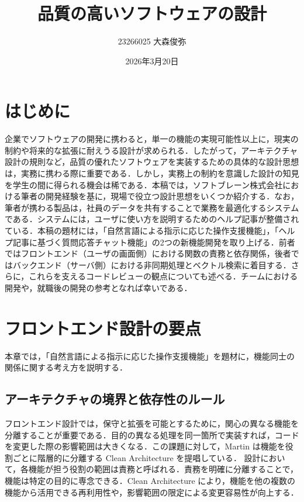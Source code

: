 \documentclass[twocolumn, 10pt]{jsarticle}
\title{品質の高いソフトウェアの設計}
\author{23266025 大森俊弥}
\date{2026年3月20日}
\begin{document}
\maketitle

\section{はじめに}

企業でソフトウェアの開発に携わると，単一の機能の実現可能性以上に，現実の制約や将来的な拡張に耐えうる設計が求められる．したがって，アーキテクチャ設計の規則など，品質の優れたソフトウェアを実装するための具体的な設計思想は，実務に携わる際に重要である\cite{evans2003ddd,martin2017cleanarchitecture,fowler2003eaa}．しかし，実務上の制約を意識した設計の知見を学生の間に得られる機会は稀である．本稿では，ソフトブレーン株式会社における筆者の開発経験を基に，現場で役立つ設計思想をいくつか紹介する．なお，筆者が携わる製品は，社員のデータを共有することで業務を最適化するシステムである．システムには，ユーザに使い方を説明するためのヘルプ記事が整備されている．本稿の題材には，「自然言語による指示に応じた操作支援機能」，「ヘルプ記事に基づく質問応答チャット機能」の2つの新機能開発を取り上げる．前者ではフロントエンド（ユーザの画面側）における関数の責務と依存関係，後者ではバックエンド（サーバ側）における非同期処理とベクトル検索に着目する．さらに，これらを支えるコードレビューの観点についても述べる．チームにおける開発や，就職後の開発の参考となれば幸いである．

\section{フロントエンド設計の要点}
本章では，「自然言語による指示に応じた操作支援機能」を題材に，機能同士の関係に関する考え方を説明する．
\subsection{アーキテクチャの境界と依存性のルール}

フロントエンド設計では，保守と拡張を可能とするために，関心の異なる機能を分離することが重要である．目的の異なる処理を同一箇所で実装すれば，コードを変更した際の影響範囲は大きくなる．この課題に対して，Martin は機能を役割ごとに階層的に分離する Clean Architecture を提唱している\cite{martin2017cleanarchitecture}． 設計において，各機能が担う役割の範囲は責務と呼ばれる．責務を明確に分離することで，機能は特定の目的に専念できる．Clean Architecture により，機能を他の複数の機能から活用できる再利用性や，影響範囲の限定による変更容易性が向上する．
\end{document}
